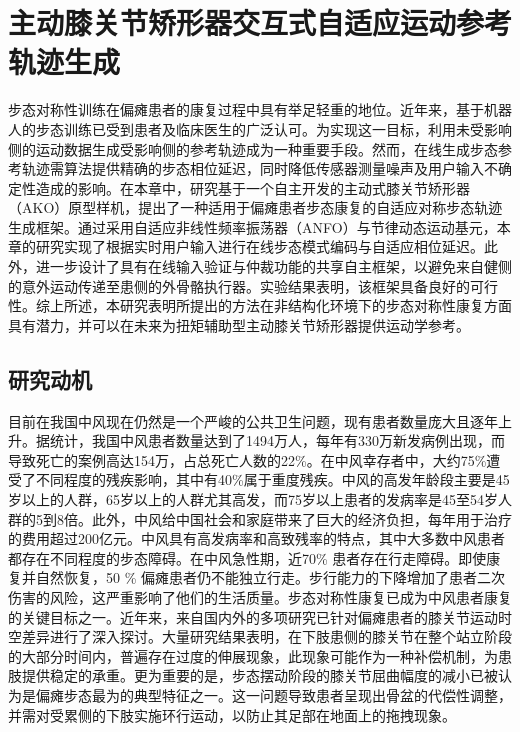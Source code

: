 \chapter{主动膝关节矫形器交互式自适应运动参考轨迹生成}
步态对称性训练在偏瘫患者的康复过程中具有举足轻重的地位。近年来，基于机器人的步态训练已受到患者及临床医生的广泛认可。为实现这一目标，利用未受影响侧的运动数据生成受影响侧的参考轨迹成为一种重要手段。然而，在线生成步态参考轨迹需算法提供精确的步态相位延迟，同时降低传感器测量噪声及用户输入不确定性造成的影响。在本章中，研究基于一个自主开发的主动式膝关节矫形器（AKO）原型样机，提出了一种适用于偏瘫患者步态康复的自适应对称步态轨迹生成框架。通过采用自适应非线性频率振荡器（ANFO）与节律动态运动基元，本章的研究实现了根据实时用户输入进行在线步态模式编码与自适应相位延迟。此外，进一步设计了具有在线输入验证与仲裁功能的共享自主框架，以避免来自健侧的意外运动传递至患侧的外骨骼执行器。实验结果表明，该框架具备良好的可行性。综上所述，本研究表明所提出的方法在非结构化环境下的步态对称性康复方面具有潜力，并可以在未来为扭矩辅助型主动膝关节矫形器提供运动学参考。
\section{研究动机}
目前在我国中风现在仍然是一个严峻的公共卫生问题，现有患者数量庞大且逐年上升。据统计，我国中风患者数量达到了1494万人，每年有330万新发病例出现，而导致死亡的案例高达154万，占总死亡人数的22\%。在中风幸存者中，大约75\%遭受了不同程度的残疾影响，其中有40\%属于重度残疾。中风的高发年龄段主要是45岁以上的人群，65岁以上的人群尤其高发，而75岁以上患者的发病率是45至54岁人群的5到8倍。此外，中风给中国社会和家庭带来了巨大的经济负担，每年用于治疗的费用超过200亿元。中风具有高发病率和高致残率的特点，其中大多数中风患者都存在不同程度的步态障碍。在中风急性期，近70\% 患者存在行走障碍。即使康复并自然恢复，50 \% 偏瘫患者仍不能独立行走\cite{jorgensenRecoveryWalkingFunction1995}。步行能力的下降增加了患者二次伤害的风险，这严重影响了他们的生活质量\cite{balabanGaitDisturbancesPatients2014,yelnikClinicalGuideAssess1999}。步态对称性康复已成为中风患者康复的关键目标之一。近年来，来自国内外的多项研究已针对偏瘫患者的膝关节运动时空差异进行了深入探讨。大量研究结果表明，在下肢患侧的膝关节在整个站立阶段的大部分时间内，普遍存在过度的伸展现象\cite{woolleyCharacteristicsGaitHemiplegia2015}，此现象可能作为一种补偿机制，为患肢提供稳定的承重。更为重要的是，步态摆动阶段的膝关节屈曲幅度的减小已被认为是偏瘫步态最为的典型特征之一\cite{lucareliALTERATIONLOADRESPONSEMECHANISM2006,campaniniMethodDifferentiateCauses2013}。这一问题导致患者呈现出骨盆的代偿性调整，并需对受累侧的下肢实施环行运动，以防止其足部在地面上的拖拽现象\cite{cruzBiomechanicalImpairmentsGait2009}。

